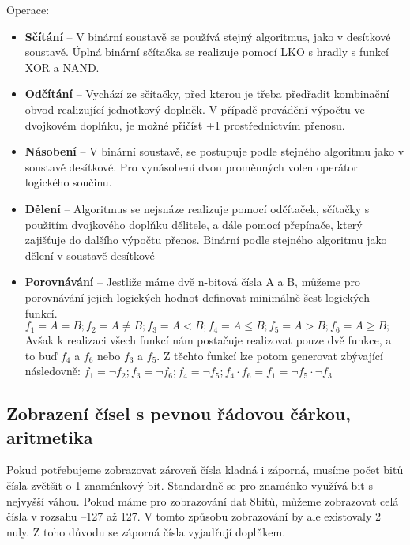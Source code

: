 Operace:
\begin{itemize}
\item \textbf{Sčítání} -- V binární soustavě se používá stejný algoritmus, jako v desítkové soustavě. Úplná binární sčítačka se realizuje pomocí LKO s hradly s funkcí XOR a NAND.

\item \textbf{Odčítání} -- Vychází ze sčítačky, před kterou je třeba předřadit kombinační obvod realizující jednotkový doplněk. V případě provádění výpočtu ve dvojkovém doplňku, je možné přičíst +1 prostřednictvím přenosu.

\item \textbf{Násobení} -- V binární soustavě, se postupuje podle stejného algoritmu jako v soustavě desítkové. Pro vynásobení dvou proměnných volen operátor logického součinu.

\item \textbf{Dělení} -- Algoritmus se nejsnáze realizuje pomocí odčítaček, sčítačky s použitím dvojkového doplňku dělitele, a dále pomocí přepínače, který zajišťuje do dalšího výpočtu přenos. Binární podle stejného algoritmu jako dělení v soustavě desítkové

\item \textbf{Porovnávání} -- Jestliže máme dvě n-bitová čísla A a B, můžeme pro porovnávání jejich logických hodnot definovat minimálně šest logických funkcí. 
$f_1 = A = B; f_2 = A \neq B; f_3 = A < B; f_4 = A \leq B; f_5 = A > B; f_6 = A \geq B;$ Avšak k realizaci všech funkcí nám postačuje realizovat pouze dvě funkce, a to buď $f_4$ a $f_6$ nebo $f_3$ a $f_5$. Z těchto funkcí lze potom generovat zbývající následovně: $f_1 = \neg f_2; f_3 = \neg f_6; f_4 = \neg f_5; f_4 \cdot f_6=f_1=\neg f_5 \cdot \neg f_3$

\end{itemize}

\subsection{Zobrazení čísel s pevnou řádovou čárkou, aritmetika}
Pokud potřebujeme zobrazovat zároveň čísla kladná i záporná, musíme počet bitů čísla zvětšit o 1 znaménkový bit. Standardně se pro znaménko využívá bit s nejvyšší váhou. Pokud máme pro zobrazování dat 8bitů, můžeme zobrazovat celá čísla v rozsahu –127 až 127. V tomto způsobu zobrazování by ale existovaly 2 nuly. Z toho důvodu se záporná čísla vyjadřují doplňkem.
